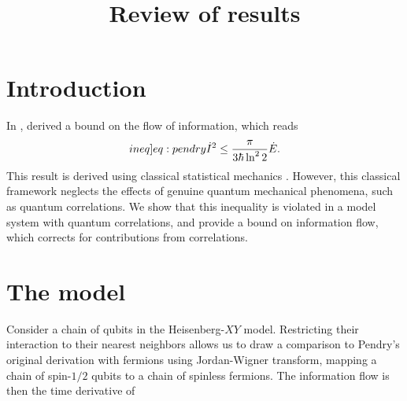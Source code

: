 \documentclass[a4paper,11pt]{scrartcl}
\author{}
\title{Review of results}
\begin{document}
\maketitle
\section{Introduction}
In \citeyear{BA_Pendry_1983}, \citeauthor{BA_Pendry_1983} derived a bound on the flow of information, which reads
\begin{align}\label[ineq]{eq:pendry}
    \dot{I}^2 \leq \frac{\pi}{3\hbar\ln^22}\dot{E}.
\end{align}
This result is derived using classical statistical mechanics \cite{BA_Pendry_1983}. However, this classical framework
neglects the effects of genuine quantum mechanical phenomena, such as quantum correlations.
We show that this inequality is violated in a model system with quantum correlations, and provide a bound on information flow,
which corrects for contributions from correlations.
\section{The model}
Consider a chain of qubits in the Heisenberg-$XY$ model. Restricting their interaction to their nearest neighbors allows
us to draw a comparison to Pendry's original derivation with fermions using Jordan-Wigner transform, mapping a chain of
spin-$1/2$ qubits to a chain of spinless fermions. The information flow is then the time derivative of 
\end{document}
